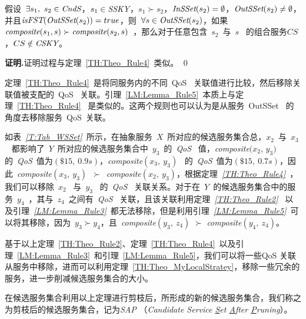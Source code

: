 \begin{lemma}\label{LM:Lemma_Rule5}


假设~$\exists s_{1},\ s_{2} \in \emph{CndS}$，$s_{1} \in \emph{SSKY}$，$s_{1} \succ s_{2}$，$\emph{InSSet}(s_{2})=\emptyset$，$\emph{OutSSet}(s_{2})\neq\emptyset$，并且$\emph{isFST}(\emph{OutSSet}(s_{2}))=true$，则~$\forall s \in \emph{OutSSet}(s_{2})$，如果~$\emph{composite}(s_{1},s) \succ \emph{composite}(s_{2},s)$~，那么对于任意包含~$s_{2}$~与~$s$~ 的组合服务$CS$，$CS \notin \emph{CSKY}$。

\end{lemma}

\textbf{证明.}证明过程与定理~\ref{TH:Theo_Rule4}~类似。
\qed


定理~\ref{TH:Theo_Rule4}~是将同服务内的不同~QoS~ 关联值进行比较，然后移除关联值被支配的~QoS~ 关联。引理~\ref{LM:Lemma_Rule5}~本质上与定理~\ref{TH:Theo_Rule4}~ 是类似的。这两个规则也可以认为是从服务~OutSSet~ 的角度去移除服务~QoS~关联。

\begin{example}

如表~\emph{\ref{T:Tab_WSSet}}~所示，在抽象服务~$X$~所对应的候选服务集合总，$x_{2}$~与~$x_{3}$~ 都影响了~$Y$~所对应的候选服务集合中~$y_{3}$~的~\emph{QoS}~ 值，\emph{composite}$(x_{2}$, $y_{3})$~ 的~\emph{QoS}~值为$(\$15,\ 0.9s)$，\emph{composite}$(x_{3},\ y_{3})$~ 的~\emph{QoS}~值为$(\$15,\ 0.7s)$，因此~\emph{composite}$(x_{3},\ y_{3})$~$\succ$~\emph{composite}$(x_{2},\ y_{3})$，根据定理~\emph{\ref{TH:Theo_Rule4}}~，我们可以移除~$x_{2}$~ 与~$y_{3}$~ 的~\emph{QoS}~ 关联关系。对于在~$Y$~的候选服务集合中的服务~$y_{4}$~，其与~$z_{4}$~之间有~\emph{QoS}~ 关联，且该关联利用定理~\emph{\ref{TH:Theo_Rule2}}~ 以及引理~\emph{\ref{LM:Lemma_Rule3}}~都无法移除，但是利用引理~\emph{\ref{LM:Lemma_Rule5}}~可以将其移除，因为~$y_{3} \succ y_{4}$，且~\emph{composite}$(y_{3},\ z_{4})$ $\succ$ \emph{composite}$(y_{4},\ z_{4})$。

\end{example}

基于以上定理~\ref{TH:Theo_Rule2}、定理~\ref{TH:Theo_Rule4}~以及引理~\ref{LM:Lemma_Rule3}~和引理~\ref{LM:Lemma_Rule5}，我们可以将一些QoS 关联从服务中移除，进而可以利用定理~\ref{TH:Theo_MyLocalStratey}，移除一些冗余的服务，进一步削减候选服务集合的大小。

\begin{definition}[剪枝后的候选服务集合]

在候选服务集合利用以上定理进行剪枝后，所形成的新的候选服务集合，我们称之为剪枝后的候选服务集合，记为\emph{SAP} （\emph{Candidate Service \underline{S}et \underline{A}fter \underline{P}runing}）。

\end{definition}

